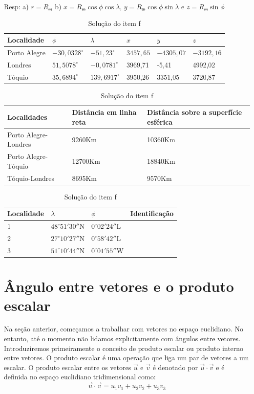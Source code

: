 \begin{table}[h]
Resp: a) $r=R_\oplus$ b)
 $x=R_\oplus \cos\phi \cos\lambda$, $y=R_\oplus \cos\phi\sin\lambda$ e $z=R_\oplus \sin\phi$
	\centering
		\begin{tabular}{|l|l|l|l|l|l|}
		\hline
	  Localidade & $\phi$ & $\lambda$ & $x$ & $y$ & $z$\\
		\hline
		Porto Alegre & $-30,0328^\circ$ & $-51,23^\circ$& $3457,65$&$-4305,07$& $-3192,16$\\
  	\hline
		Londres & $51,5078^\circ$ & $-0,0781^\circ$&3969,71&-5,41&4992,02\\
  	\hline
  	Tóquio & $35,6894^\circ$ & $139,6917^\circ$&3950,26&3351,05&3720,87\\
  	\hline
		\end{tabular}
	\caption{Coordenadas geográficas  e cartesianas de algumas cidades - solução do item d.}
\vspace{10pt}
		\begin{tabular}{|l|l|l|}
		\hline
	  Localidades & Distância em linha reta & Distância sobre a superfície esférica \\
		\hline
		Porto Alegre-Londres & 9260Km & 10360Km\\
  	\hline
  	Porto Alegre-Tóquio & 12700Km&18840Km\\
  	\hline
		Tóquio-Londres &8695Km &9570Km\\
  	\hline
		\end{tabular}
	\caption{Distância entre as cidades - solução do item e.}

\vspace{10pt}
		\begin{tabular}{|l|l|l|l|}
		\hline
Localidade &	  $\lambda$ & $\phi$& Identificação\\
		\hline
1&		$48^\circ 51{'}30{''}$N &	$0^\circ 02{'}24{''}$L & \\
	\hline
2&	  $27^\circ 10{'}27{''}$N & 	$0^\circ 58{'}42{''}$L & \\
	\hline
3&	  $51^\circ 10{'}44{''}$N & $0^\circ 01{'}55{''}$W&  \\
		\hline
		\end{tabular}
	\caption{Solução do item f}
\end{table}


\section{Ângulo entre vetores e o produto escalar}
Na seção anterior, começamos a trabalhar com vetores no espaço euclidiano. No entanto, até o momento não lidamos explicitamente com ângulos entre vetores. Introduziremos primeiramente o conceito de produto escalar ou produto interno entre vetores. O produto escalar é uma operação que liga um par de vetores a um escalar. O produto escalar entre os vetores $\vec{u}$ e $\vec{v}$  é denotado por $\vec{u}\cdot \vec{v}$ e é definida no espaço euclidiano tridimensional como:
\begin{equation}\label{defprodesc}\vec{u}\cdot\vec{v}=u_1v_1+u_2v_2+u_3v_3\end{equation}


